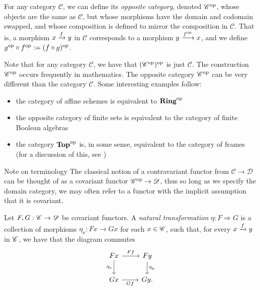 \documentclass{article}[11pt]
\begin{document}
\begin{definition} For any category $\mathscr{C}$, we can define its \textit{opposite category}, denoted $\mathscr{C}^{\text{op}}$, whose objects are the same as $\mathscr{C}$, but whose morphisms have the domain and codomain swapped, and whose composition is defined to mirror the composition in $\mathscr{C}$. That is, a morphism $x\xrightarrow{f} y$ in $\mathscr{C}$ corresponds to a morphism $y\xrightarrow{f^{\text{op}}} x$, and we define $g^{\text{op}} \circ f^{\text{op}} := (f\circ g)^{\text{op}}$.
\end{definition}

Note that for any category $\mathscr{C}$, we have that $(\mathscr{C}^{\text{op}})^{\text{op}}$ is just $\mathscr{C}$. The construction $\mathscr{C}^{\text{op}}$ occurs frequently in mathematics. The opposite category $\mathscr{C}^{\text{op}}$ can be very different than the category $\mathscr{C}$. Some interesting examples follow:
\vspace{-1em}
\begin{itemize}\itemsep0em 
    \item the category of affine schemes is equivalent to $\textbf{Ring}^{\text{op}}$
     \item the opposite category of finite sets is equivalent to the category of finite Boolean algebras
    \item the category $\textbf{Top}^{\text{op}}$ is, in some sense, equivalent to the category of frames  (for a discussion of this, see \cite{top-op-mathse})
\end{itemize}



\begin{customenvironment}{Note on terminology} The classical notion of a contravariant functor from $\mathscr{C}\to\mathscr{D}$ can be thought of as a covariant functor $\mathscr{C}^{\text{op}} \to \mathscr{D}$, thus so long as we specify the domain category, we may often refer to a functor with the implicit assumption that it is covariant.
\end{customenvironment}







\begin{definition} Let $F,G : \mathscr{C} \to \mathscr{D}$ be covariant functors. A \textit{natural transformation} $\eta : F \Rightarrow G$ is a collection of morphisms $\eta_x : Fx \to Gx$ for each $x\in \mathscr{C}$, such that, for every $x\xrightarrow{f} y$ in $\mathscr{C}$, we have that the diagram commutes
\[
	\begin{tikzcd}
	Fx\rar["Ff" above]\dar["\eta_x" left] & Fy\dar["\eta_y" right] \\
	Gx\rar["Gf" below] & Gy.
	\end{tikzcd}
\]
\end{definition}
\end{document}
